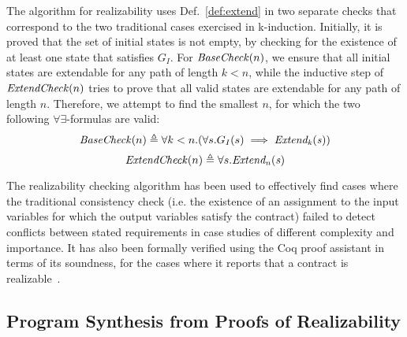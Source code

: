 The algorithm for realizability uses Def.~\ref{def:extend} in two
separate checks that correspond to the two traditional cases exercised
in k-induction. Initially, it is proved that the set of initial states is
not empty, by checking for the existence of at least one
state that satisfies $G_I$. For ${\mathit {BaseCheck}}(n)$, we ensure
that all initial states are extendable for any path of length $k < n$,
while the inductive step of ${\mathit {ExtendCheck}}(n)$ tries to prove that
all valid states are extendable for any path of length $n$. Therefore,
we attempt to find the smallest $n$, for which the two following
$\forall\exists$-formulas are valid:%
%
\begin{equation}
\label{eq:sbcheck}
{\mathit {BaseCheck}}(n) \triangleq \forall k < n. (\forall s. G_I(s)
	  	\implies {\mathit {Extend_{k}(s)}})
\end{equation}%
%
\begin{equation}
\label{eq:echeck}
{\mathit {ExtendCheck}}(n) \triangleq \forall s. {\mathit {Extend_{n}(s)}}
\end{equation}

The realizability checking algorithm has been used to effectively find cases
where the traditional consistency check (i.e. the existence of an assignment
to the input variables for which the output variables satisfy the contract)
failed to detect conflicts between stated requirements in case studies of
different complexity and importance. It has also been formally verified using the Coq proof assistant in terms of its
soundness, for the cases where it reports that a contract is
realizable~\cite{katis2015machine}.

\subsection{Program Synthesis from Proofs of Realizability}
\label{sec:realizability-synthesis}

